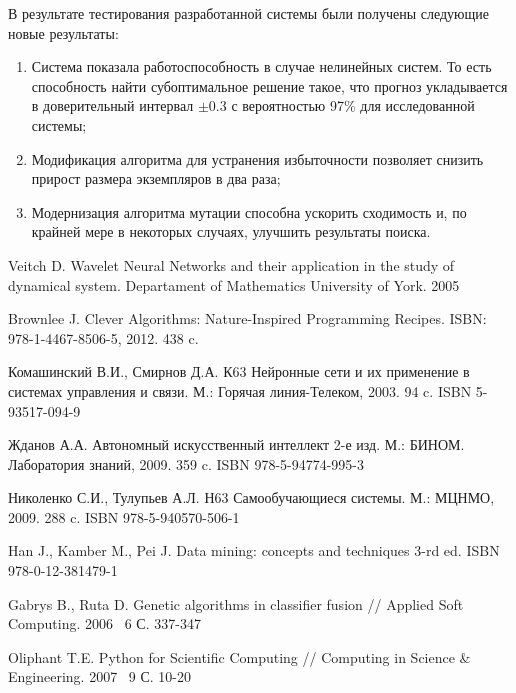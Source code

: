 \documentclass[utf8,usehyperref,14pt]{G7-32}
\begin{document}
В результате тестирования разработанной системы были получены следующие новые результаты:
\begin{enumerate}
\item Система показала работоспособность в случае нелинейных систем. То есть способность найти субоптимальное решение такое, что прогноз укладывается в доверительный интервал $ \pm 0.3 $ с вероятностью 97\% для исследованной системы;
\item Модификация алгоритма для устранения избыточности позволяет снизить прирост размера экземпляров в два раза;
\item Модернизация алгоритма мутации способна ускорить сходимость и, по крайней мере в некоторых случаях, улучшить результаты поиска.
\end{enumerate}


\begin{thebibliography}{1} %

{Veitch} D.
\newblock Wavelet Neural Networks and their application in the study of dynamical system.
\newblock Departament of Mathematics University of York. 2005


{Brownlee} J.
\newblock Clever Algorithms: Nature-Inspired Programming Recipes.
\newblock ISBN: 978-1-4467-8506-5, 2012. 438 c.

{Комашинский} В.И., {Смирнов} Д.А.
\newblock К63 Нейронные сети и их применение в системах управления и связи.
\newblock М.: Горячая линия-Телеком, 2003. 94 c. ISBN 5-93517-094-9

{Жданов} А.А.
\newblock Автономный искусственный интеллект 2-е изд.
\newblock М.: БИНОМ. Лаборатория знаний, 2009. 359 c. ISBN 978-5-94774-995-3

{Николенко} С.И., {Тулупьев} А.Л.
\newblock Н63 Самообучающиеся системы.
\newblock М.: МЦНМО, 2009. 288 c. ISBN 978-5-940570-506-1

{Han} J., {Kamber} M., {Pei} J.
\newblock Data mining: concepts and techniques 3-rd ed.
\newblock ISBN 978-0-12-381479-1

{Gabrys} B., {Ruta} D.
\newblock Genetic algorithms in classifier fusion
\newblock // Applied Soft Computing. 2006 \No \ 6 С. 337-347

{Oliphant} T.E.
\newblock Python for Scientific Computing
\newblock // Computing in Science \& Engineering. 2007 \No \ 9 С. 10-20

\end{thebibliography}
\end{document}
